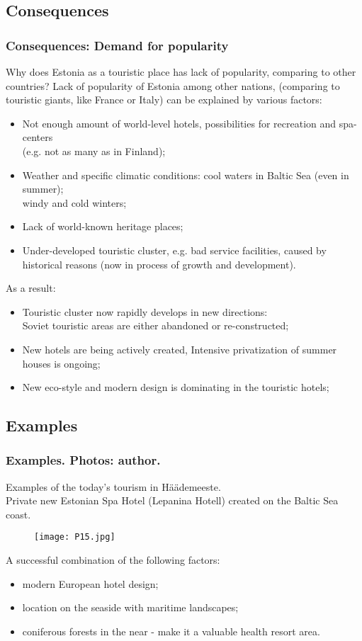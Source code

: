 \documentclass[pdflatex,compress,8pt,
	xcolor={dvipsnames,dvipsnames,svgnames,x11names,table},
	hyperref={	
	breaklinks = true, 
	pdfauthor={Lemenkova Polina}, 
	pdfsubject={Preentation}, 
	pdfcreator={Lemenkova Polina}, 
	pdfproducer={Lemenkova Polina}, 
	colorlinks=true,
	linkcolor=Tomato, 
	citecolor=DeepPink3, 
	urlcolor = NavyBlue, 
	breaklinks = true}]{beamer}
\begin{document}
\subsection{Consequences}
\begin{frame}\frametitle{Consequences: Demand for popularity}
Why does Estonia as a touristic place has lack of popularity, comparing to other countries? Lack of popularity of Estonia among other nations, (comparing to touristic giants, like France or Italy) can be explained by various factors:
\begin{itemize}
	\item Not enough amount of world-level hotels, possibilities for recreation and spa-centers\\ (e.g. not as many as in Finland);
	\item Weather and specific climatic conditions: cool waters in Baltic Sea (even in summer); \\windy and cold winters;
	\item Lack of world-known heritage places;
	\item Under-developed touristic cluster, e.g. bad service facilities, caused by historical reasons (now in process of growth and development).
\end{itemize}
As a result:
\begin{itemize}
	\item Touristic cluster now rapidly develops in new directions: \\Soviet touristic areas are either abandoned or re-constructed;
	\item New hotels are being actively created, Intensive privatization of summer houses is ongoing;
	\item New eco-style and modern design is dominating in the touristic hotels;
\end{itemize}
\end{frame}

\subsection{Examples}
\begin{frame}\frametitle{Examples. Photos: author.}
\vspace{3em}
Examples of the today's tourism in Häädemeeste.\\
Private new Estonian Spa Hotel (Lepanina Hotell) created on the Baltic Sea coast.
\begin{figure}[H]
	\centering
		\texttt{[image: P15.jpg]}
\end{figure}
A successful combination of the following factors:
\begin{itemize}
	\item modern European hotel design;
	\item location on the seaside with maritime landscapes;
	\item coniferous forests in the near - make it a valuable health resort area. 
\end{itemize}
\end{frame}
\end{document}

